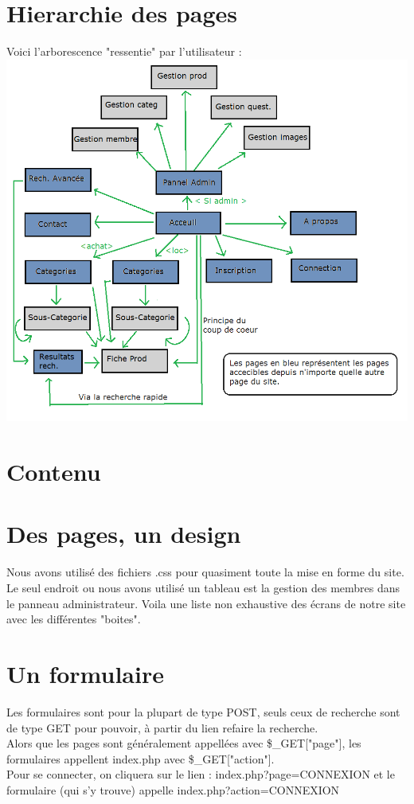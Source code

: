 \section{Hierarchie des pages}
			Voici l'arborescence "ressentie" par l'utilisateur :
			\linebreak
\includegraphics[scale=0.5]{arbo.png}
			
		\section{Contenu}
			
			
		\section{Des pages, un design}	
			Nous avons utilisé des fichiers .css pour quasiment toute la mise en forme du site. Le seul endroit ou nous avons utilisé un tableau est la gestion des membres dans le panneau administrateur. Voila une liste non exhaustive des écrans de notre site avec les différentes "boites".
					
			
		\section{Un formulaire}
			Les formulaires sont pour la plupart de type POST, seuls ceux de recherche sont de type GET pour pouvoir, à partir du lien refaire la recherche.\\
			Alors que les pages sont généralement appellées avec \$\_GET["page"], les formulaires appellent index.php avec \$\_GET["action"].\\
			Pour se connecter, on cliquera sur le lien : index.php?page=CONNEXION et le formulaire (qui s'y trouve) appelle index.php?action=CONNEXION
